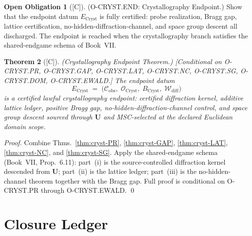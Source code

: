 \documentclass[12pt,oneside]{amsbook}
\theoremstyle{plain}
\newtheorem{theorem}{Theorem}[section]
\theoremstyle{definition}
\newtheorem{obligation}[theorem]{Open Obligation}
\theoremstyle{remark}
\newcommand{\status}[1]{\textup{[#1]}}
\begin{document}
\begin{obligation}[\status{C}]\label{ob:cryst-END}
\textup{(O-CRYST.END: Crystallography Endpoint.)}
Show that the endpoint datum $E_{\mathrm{Cryst}}$ is fully certified:
probe realization, Bragg gap, lattice certification,
no-hidden-diffraction-channel, and space group descent all
discharged.  The endpoint is reached when the crystallography branch
satisfies the shared-endgame schema of Book~VII.
\end{obligation}

\begin{theorem}[\status{C}]\label{thm:cryst-END}
\textup{(Crystallography Endpoint Theorem.)}
\textup{[Conditional on O-CRYST.PR, O-CRYST.GAP, O-CRYST.LAT,
O-CRYST.NC, O-CRYST.SG, O-CRYST.DOM, O-CRYST.EWALD.]}
The endpoint datum
\[
  E_{\mathrm{Cryst}} \;=\;
  \bigl(\mathcal{C}_{\mathrm{obs}},\;
        \mathcal{O}_{\mathrm{Cryst}},\;
        B_{\mathrm{Cryst}},\;
        \mathcal{W}_{\mathrm{diff}}\bigr)
\]
is a certified lawful crystallography endpoint: certified
diffraction kernel, additive lattice ledger, positive Bragg gap,
no-hidden-diffraction-channel control, and space group descent
sourced through $\mathbf{U}$ and MSC-selected at the declared
Euclidean domain scope.
\end{theorem}

\begin{proof}
Combine Thms.~\ref{thm:cryst-PR}, \ref{thm:cryst-GAP},
\ref{thm:cryst-LAT}, \ref{thm:cryst-NC}, and \ref{thm:cryst-SG}.
Apply the shared-endgame schema (Book~VII, Prop.~6.11): part~(i)
is the source-controlled diffraction kernel descended from
$\mathbf{U}$; part~(ii) is the lattice ledger; part~(iii) is the
no-hidden-channel theorem together with the Bragg gap.  Full proof
is conditional on O-CRYST.PR through O-CRYST.EWALD.
\qed
\end{proof}

\section{Closure Ledger}
\label{sec:cryst-closure}
\end{document}
